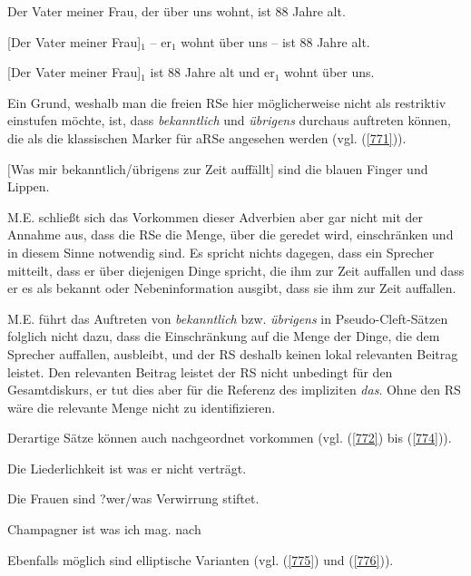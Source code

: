 \begin{exe}
	\ex\label{768} 
	Der Vater meiner Frau, der über uns wohnt, ist 88 Jahre alt.		
\end{exe}
\vspace{-0.65cm}
\begin{exe}
	\ex\label{769} 
	[Der Vater meiner Frau]$_{1}$ – er$_{1}$ wohnt über uns – ist 88 Jahre alt.		
\end{exe}	
\vspace{-0.65cm}
\begin{exe}
	\ex\label{770} 
	[Der Vater meiner Frau]$_{1}$ ist 88 Jahre alt und er$_{1}$ wohnt über uns.	
\end{exe}
Ein Grund, weshalb man die freien RSe hier möglicherweise nicht als restriktiv einstufen möchte, ist, dass \textit{bekanntlich} und \textit{übrigens} durchaus auftreten können, die als die klassischen Marker für aRSe angesehen werden (vgl. (\ref{771})).

\begin{exe}
	\ex\label{771} 
	$[$Was mir bekanntlich/übrigens zur Zeit auffällt$]$ sind die blauen Finger und Lippen.
\end{exe}	
M.E. schließt sich das Vorkommen dieser Adverbien aber gar nicht mit der Annahme aus, dass die RSe die Menge, über die geredet wird, einschränken und in diesem Sinne notwendig sind. Es spricht nichts dagegen, dass ein Sprecher mitteilt, dass er über diejenigen Dinge spricht, die ihm zur Zeit auffallen und dass er es als bekannt oder Nebeninformation ausgibt, dass sie ihm zur Zeit auffallen. 

M.E. führt das Auftreten von \textit{bekanntlich} bzw. \textit{übrigens} in Pseudo-Cleft-Sätzen folglich nicht dazu, dass die Einschränkung auf die Menge der Dinge, die dem Sprecher auffallen, ausbleibt, und der RS deshalb keinen lokal relevanten Beitrag leistet. Den relevanten Beitrag leistet der RS nicht unbedingt für den Gesamtdiskurs, er tut dies aber für die Referenz des impliziten \textit{das}. Ohne den RS wäre die relevante Menge nicht zu identifizieren.

Derartige Sätze können auch nachgeordnet vorkommen (vgl. (\ref{772}) bis (\ref{774})).

\begin{exe}
	\ex\label{772} 
	Die Liederlichkeit ist was er nicht verträgt.
	\hfill\hbox {\citet[327]{Birkner2008}}
\end{exe}
\vspace{-0.65cm}
\begin{exe}
	\ex\label{773} 
	Die Frauen sind ?wer/was Verwirrung stiftet.
	\hfill\hbox {\citet[13]{Altmann2009}}
\end{exe}
\vspace{-0.65cm}
\begin{exe}
	\ex\label{774} 
	Champagner ist was ich mag.
	\hfill\hbox {nach \citet[467]{Lambrecht2001}}
\end{exe}
Ebenfalls möglich sind elliptische Varianten (vgl. (\ref{775}) und (\ref{776})).

